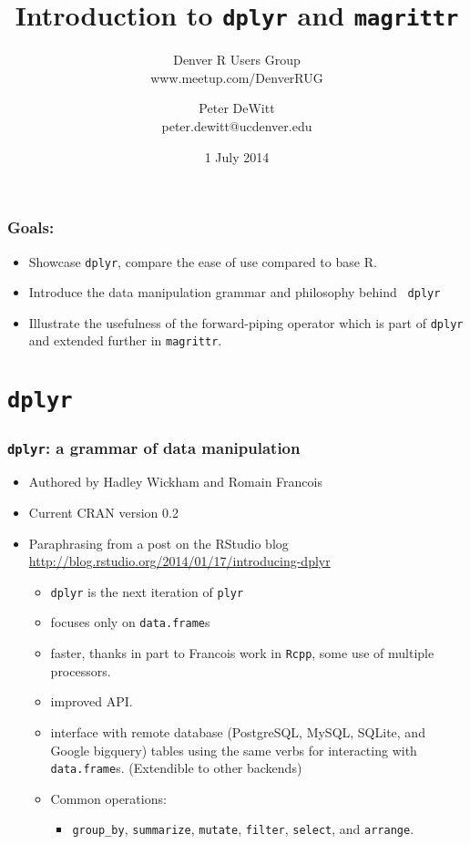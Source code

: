 \documentclass{beamer}\usepackage[]{graphicx}\usepackage[]{color}
\author{Peter DeWitt\\peter.dewitt@ucdenver.edu}
\date{1 July 2014}
\title{Introduction to {\tt dplyr} and {\tt magrittr}}
\subtitle{Denver R Users Group\\www.meetup.com/DenverRUG}
\begin{document}
\begin{frame}[fragile]
  \maketitle
\end{frame} 

\begin{frame}[fragile]
  \frametitle{Goals:}

  \begin{itemize}
    \item Showcase {\tt dplyr}, compare the ease of use compared to base R.
    \item Introduce the data manipulation grammar and philosophy behind {\tt
      dplyr}
    \item Illustrate the usefulness of the forward-piping operator which is
      part of {\tt dplyr} and extended further in {\tt magrittr}.  
  \end{itemize}

  \tableofcontents

\end{frame} 

\section{{\tt dplyr}}%
\begin{frame}[fragile]
  \frametitle{{\tt dplyr}: a grammar of data manipulation}
  \begin{itemize}
    \item Authored by Hadley Wickham and Romain Francois
    \item Current CRAN version 0.2

    \item<2-> Paraphrasing from a post on the RStudio blog
      \url{http://blog.rstudio.org/2014/01/17/introducing-dplyr}

      \begin{itemize}
        \item {\tt dplyr} is the next iteration of {\tt plyr}
        \item focuses only on {\tt data.frame}s
        \item faster, thanks in part to Francois work in {\tt Rcpp}, some use of
          multiple processors.
        \item improved API. 
        \item interface with remote database (PostgreSQL, MySQL, SQLite, and
          Google bigquery) tables using the same verbs for
          interacting with {\tt data.frame}s.  (Extendible to other backends)
        \item Common operations:
          \begin{itemize}
            \item {\tt group\_by}, {\tt summarize}, {\tt mutate}, {\tt filter},
              {\tt select}, and {\tt arrange}.
          \end{itemize}
      \end{itemize}

  \end{itemize}
\end{frame} 
\end{document}
